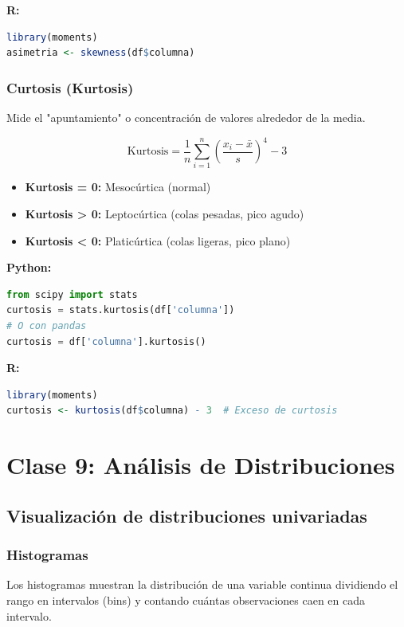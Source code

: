 \documentclass[a4paper,11pt]{article}
\begin{document}
\textbf{R:}
\begin{lstlisting}[language=R]
library(moments)
asimetria <- skewness(df$columna)
\end{lstlisting}

\subsubsection{Curtosis (Kurtosis)}

Mide el "apuntamiento" o concentración de valores alrededor de la media.

$$\text{Kurtosis} = \frac{1}{n}\sum_{i=1}^{n}\left(\frac{x_i - \bar{x}}{s}\right)^4 - 3$$

\begin{itemize}
    \item \textbf{Kurtosis = 0:} Mesocúrtica (normal)
    \item \textbf{Kurtosis > 0:} Leptocúrtica (colas pesadas, pico agudo)
    \item \textbf{Kurtosis < 0:} Platicúrtica (colas ligeras, pico plano)
\end{itemize}

\textbf{Python:}
\begin{lstlisting}[language=Python]
from scipy import stats
curtosis = stats.kurtosis(df['columna'])
# O con pandas
curtosis = df['columna'].kurtosis()
\end{lstlisting}

\textbf{R:}
\begin{lstlisting}[language=R]
library(moments)
curtosis <- kurtosis(df$columna) - 3  # Exceso de curtosis
\end{lstlisting}

\section{Clase 9: Análisis de Distribuciones}

\subsection{Visualización de distribuciones univariadas}

\subsubsection{Histogramas}

Los histogramas muestran la distribución de una variable continua dividiendo el rango en intervalos (bins) y contando cuántas observaciones caen en cada intervalo.
\end{document}
